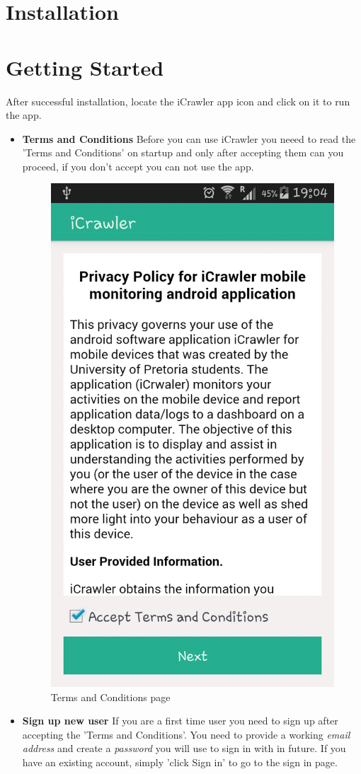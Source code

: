 \documentclass[hidelinks, 12pt, oneside]{article}
\begin{document}
	\section{Installation}\newpage
	
	\section{Getting Started}
	After successful installation, locate the iCrawler app icon and click on it to run the app.\
	
	 \begin{itemize}
	 	\item \textbf{Terms and Conditions}\newline
	 	Before you can use iCrawler you neeed to read the 'Terms and Conditions' on startup and only 
	 	after accepting them can you proceed, if you don't accept you can not use the app.
	 	 
	 	 \begin{figure}[h!]
	 	 	\caption{Terms and Conditions page}
	 	 	\centering 																												\includegraphics[width=0.5 \textwidth]{img/tnc2.png}
	 	 \end{figure}\newpage
	 	 
	 	\item \textbf{Sign up new user}\newline
	 	If you are a first time user you need to sign up after accepting the 'Terms and Conditions'. You need
	 	to provide a working \emph{email address} and create a \emph{password} you will use to sign in with in future.
	 	If you have an existing account, simply 'click Sign in' to go to the sign in page.
	 	 

\end{itemize}
\end{document}
